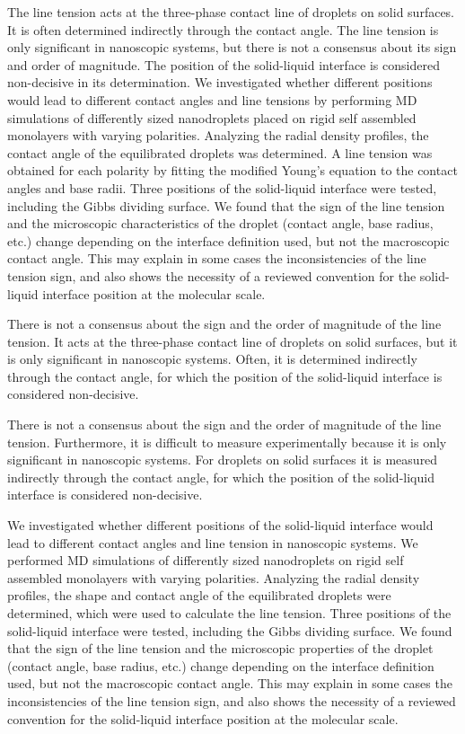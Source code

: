 The line tension acts at the three-phase contact line of droplets
on solid surfaces. It is often determined indirectly through the contact
angle. The line tension is only significant in nanoscopic systems,
but there is not a consensus about its sign and order of magnitude.
The position of the solid-liquid interface is considered non-decisive
in its determination. We investigated whether different positions
would lead to different contact angles and line tensions by performing
MD simulations of differently sized nanodroplets placed on rigid self
assembled monolayers with varying polarities. Analyzing the radial
density profiles, the contact angle of the equilibrated droplets was
determined. A line tension was obtained for each polarity by fitting
the modified Young's equation to the contact angles and base radii.
Three positions of the solid-liquid interface were tested, including
the Gibbs dividing surface. We found that the sign of the line tension
and the microscopic characteristics of the droplet (contact angle,
base radius, etc.) change depending on the interface definition used,
but not the macroscopic contact angle. This may explain in some cases
the inconsistencies of the line tension sign, and also shows the necessity
of a reviewed convention for the solid-liquid interface position at
the molecular scale.

There is not a consensus about the sign and the order of magnitude
of the line tension. It acts at the three-phase contact line of droplets
on solid surfaces, but it is only significant in nanoscopic systems.
Often, it is determined indirectly through the contact angle, for
which the position of the solid-liquid interface is considered non-decisive. 


There is not a consensus about the sign and the order of magnitude
of the line tension. Furthermore, it is difficult to measure experimentally
because it is only significant in nanoscopic systems. For droplets
on solid surfaces it is measured indirectly through the contact angle,
for which the position of the solid-liquid interface is considered
non-decisive.


We investigated whether different positions of the solid-liquid interface
would lead to different contact angles and line tension in nanoscopic
systems. We performed MD simulations of differently sized nanodroplets
on rigid self assembled monolayers with varying polarities. Analyzing
the radial density profiles, the shape and contact angle of the equilibrated
droplets were determined, which were used to calculate the line tension.
Three positions of the solid-liquid interface were tested, including
the Gibbs dividing surface. We found that the sign of the line tension
and the microscopic properties of the droplet (contact angle, base
radius, etc.) change depending on the interface definition used, but
not the macroscopic contact angle. This may explain in some cases
the inconsistencies of the line tension sign, and also shows the necessity
of a reviewed convention for the solid-liquid interface position at
the molecular scale.